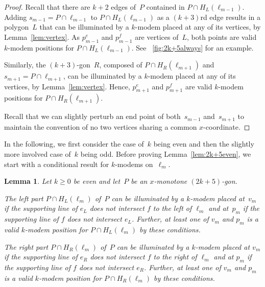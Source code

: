 \documentclass[A4]{article}
\newtheorem{lemma}[theorem]{Lemma}
\begin{document}
\begin{proof}
Recall that there are $k+2$ edges of~$P$ contained in $P\cap H_L(\ell_{m-1})$.
Adding $s_{m-1}=P\cap\ell_{m-1}$ to $P\cap H_L(\ell_{m-1})$ as a $(k+3)$rd edge results in a polygon~$L$ that can be illuminated by a \mbox{$k$-modem} placed at any of its vertices, by Lemma~\ref{lem:vertex}.
As $p^e_{m-1}$ and $p^f_{m-1}$ are vertices of~$L$, both points are valid \mbox{$k$-modem} positions for $P\cap H_L(\ell_{m-1})$.
See \figurename~\ref{fig:2k+5always} for an example.

Similarly, the $(k+3)$-gon~$R$, composed of $P\cap H_R(\ell_{m+1})$ and $s_{m+1}=P\cap\ell_{m+1}$, can be illuminated by a \mbox{$k$-modem} placed at any of its vertices, by Lemma~\ref{lem:vertex}.
Hence, $p^e_{m+1}$ and $p^f_{m+1}$ are valid \mbox{$k$-modem} positions for $P\cap H_R(\ell_{m+1})$.

Recall that we can slightly perturb an end point of both~$s_{m-1}$ and~$s_{m+1}$ to maintain the convention of no two vertices sharing a common $x$-coordinate.
\end{proof}


In the following, we first consider the case of~$k$ being even and then the slightly more involved case of~$k$ being odd.
Before proving Lemma~\ref{lem:2k+5even}, we start with a conditional result for \mbox{$k$-modems} on~$\ell_m$.


\begin{lemma}\label{lem:2k+5subeven}
Let $k\geq0$ be even and let~$P$ be an $x$-monotone $(2k+5)$-gon.

The left part $P\cap H_L(\ell_{m})$ of~$P$ can be illuminated by a \mbox{$k$-modem} placed
at~$v_m$ if the supporting line of $e_L$ does not intersect $f$ to the left of $\ell_m$ and
at~$p_m$ if the supporting line of $f$ does not intersect $e_L$.
Further, at least one of $v_m$ and $p_m$ is a valid \mbox{$k$-modem} position for $P\cap H_L(\ell_{m})$ by these conditions.

The right part $P\cap H_R(\ell_{m})$ of~$P$ can be illuminated by a \mbox{$k$-modem} placed
at $v_m$ if the supporting line of $e_R$ does not intersect $f$ to the right of $\ell_m$ and
at $p_m$ if the supporting line of $f$ does not intersect $e_R$.
Further, at least one of $v_m$ and $p_m$ is a valid \mbox{$k$-modem} position for $P\cap H_R(\ell_{m})$ by these conditions.
\end{lemma}
\end{document}
